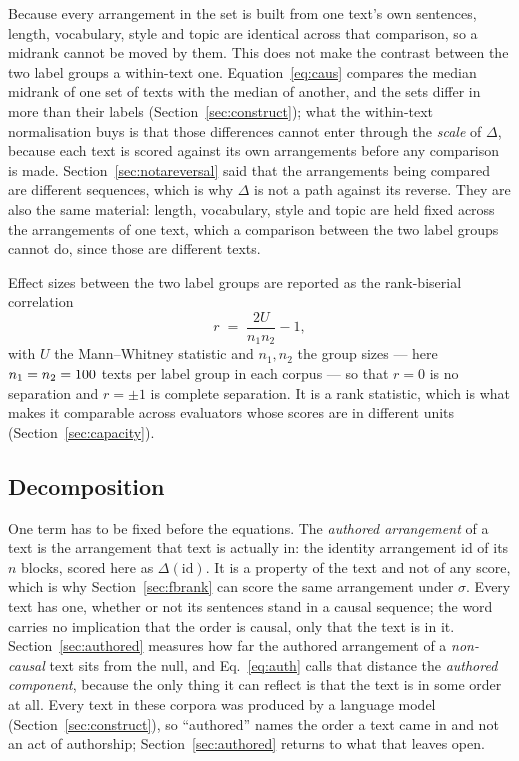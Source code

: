 \documentclass[11pt]{article}
\begin{document}
Because every arrangement in the set is built from one text's own
sentences, length, vocabulary, style and topic are identical across that
comparison, so a midrank cannot be moved by them.  This does not make the
contrast between the two label groups a within-text one.
Equation~\eqref{eq:caus} compares the median midrank of one set of texts
with the median of another, and the sets differ in more than their labels
(Section~\ref{sec:construct}); what the within-text normalisation buys is
that those differences cannot enter through the \emph{scale} of $\Delta$,
because each text is scored against its own arrangements before any
comparison is made.  Section~\ref{sec:notareversal} said that the
arrangements being compared are different sequences, which is why $\Delta$
is not a path against its reverse.  They are also the same material: length, vocabulary, style and topic are held
fixed across the arrangements of one text, which a comparison between the two
label groups cannot do, since those are different texts.

Effect sizes between the two label groups are reported as the
rank-biserial correlation
\begin{equation}
r \;=\; \frac{2U}{n_1 n_2} - 1 ,
\label{eq:rb}
\end{equation}
with $U$ the Mann--Whitney statistic and $n_1, n_2$ the group sizes --- here
$n_1 = n_2 = 100$ texts per label group in each corpus
\cite{sagawa2026} --- so that
$r = 0$ is no separation and $r = \pm 1$ is complete separation.  It is a
rank statistic, which is what makes it comparable across evaluators whose
scores are in different units (Section~\ref{sec:capacity}).

\subsection{Decomposition}
\label{sec:decomp}
One term has to be fixed before the equations.  The \emph{authored arrangement} of a
text is the arrangement that text is actually in: the identity arrangement
$\mathrm{id}$ of its $n$ blocks, scored here as $\Delta(\mathrm{id})$.  It is
a property of the text and not of any score, which is why
Section~\ref{sec:fbrank} can score the same arrangement under $\sigma$.  Every text has one, whether or not its sentences
stand in a causal sequence; the word carries no implication that the order is
causal, only that the text is in it.  Section~\ref{sec:authored} measures
how far the authored arrangement of a \emph{non-causal} text sits from the null,
and Eq.~\eqref{eq:auth} calls that distance the \emph{authored component},
because the only thing it can reflect is that the text is in some order at
all.  Every text in these corpora was produced by a language model
(Section~\ref{sec:construct}), so ``authored'' names the order a text came
in and not an act of authorship; Section~\ref{sec:authored} returns to what
that leaves open.
\end{document}
